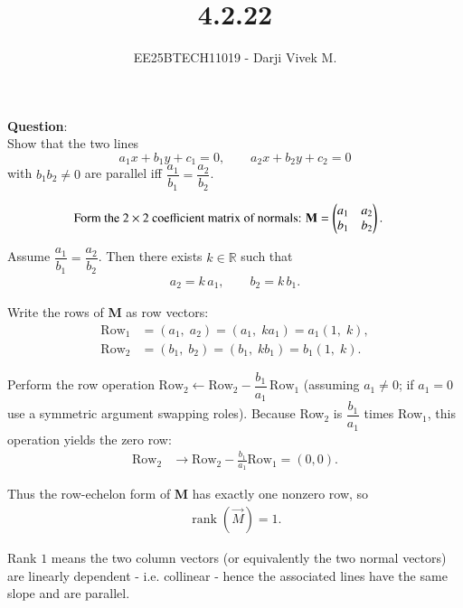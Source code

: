 \documentclass[journal]{IEEEtran}
\begin{document}


\title{4.2.22}
\author{EE25BTECH11019 - Darji Vivek M.}
{\let\newpage\relax\maketitle}

\renewcommand{\thefigure}{\theenumi}
\renewcommand{\thetable}{\theenumi}
\setlength{\intextsep}{10pt}
\renewcommand{\thetable}{\theenumi}
\textbf{Question}:\\
Show that the two lines
\[
a_1 x + b_1 y + c_1 = 0,\qquad a_2 x + b_2 y + c_2 = 0
\]
with \(b_1 b_2\neq 0\) are parallel iff \(\dfrac{a_1}{b_1}=\dfrac{a_2}{b_2}\).
\\
\solution

\begin{align}
&\text{Form the $2\times2$ coefficient matrix of normals: } 
\mathbf{M}=\begin{pmatrix}a_1 & a_2\\ b_1 & b_2\end{pmatrix}.
\end{align}

Assume \(\dfrac{a_1}{b_1}=\dfrac{a_2}{b_2}\). Then there exists \(k\in\mathbb{R}\) such that
\begin{align}
a_2 = k\,a_1,\qquad b_2 = k\,b_1.
\end{align}

Write the rows of \textbf{M} as row vectors:
\begin{align}
\text{Row}_1 &= (a_1,\;a_2) = (a_1,\;k a_1) = a_1(1,\;k),\\
\text{Row}_2 &= (b_1,\;b_2) = (b_1,\;k b_1) = b_1(1,\;k).
\end{align}

Perform the row operation \( \text{Row}_2 \leftarrow \text{Row}_2 - \dfrac{b_1}{a_1}\,\text{Row}_1\) (assuming \(a_1\neq0\); if \(a_1=0\) use a symmetric argument swapping roles). Because Row\(_2\) is \( \dfrac{b_1}{a_1}\) times Row\(_1\), this operation yields the zero row:
\begin{align}
\text{Row}_2 &\rightarrow \text{Row}_2 - \frac{b_1}{a_1}\text{Row}_1 = (0,0).
\end{align}

Thus the row-echelon form of \textbf{M} has exactly one nonzero row, so
\begin{align}
\operatorname{rank}(\vec{M})=1.
\end{align}

Rank \(1\) means the two column vectors (or equivalently the two normal vectors) are linearly dependent - i.e. collinear - hence the associated lines have the same slope and are parallel.
\end{document}
